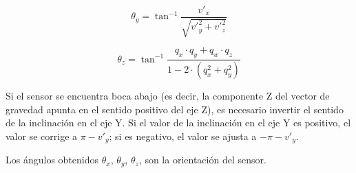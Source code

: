 \begin{equation}
	\theta_y = \tan^{-1}\frac{v'_x}{\sqrt{v'^2_y + v'^2_z}}
	\label{eq:anguloy}
\end{equation}

\begin{equation}
	\theta_z = \tan^{-1}\frac{q_x \cdot q_y + q_w \cdot q_z}{1 - 2 \cdot (q_x^2 + q_y^2)}
	\label{eq:anguloz}
\end{equation}

Si el sensor se encuentra boca abajo (es decir, la componente Z del vector de gravedad apunta en el sentido positivo del eje Z), es necesario invertir el sentido de la inclinación en el eje Y. Si el valor de la inclinación en el eje Y es positivo, el valor se corrige a $\pi - v'_y$; si es negativo, el valor se ajusta a $-\pi - v'_y$.

Los ángulos obtenidos $\theta_x$, $\theta_y$, $\theta_z$, son la orientación del sensor.